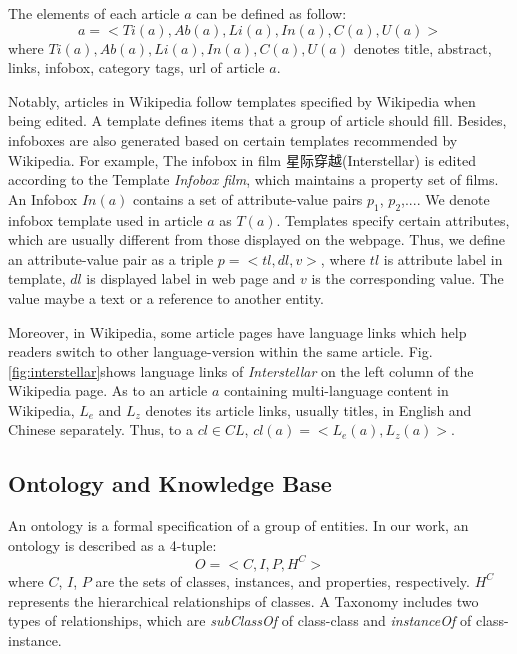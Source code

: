 \documentclass[runningheads,a4paper]{llncs}
\begin{document}
%
The elements of each article $a$ can be defined as follow:
\begin{equation}
    a = <Ti(a),Ab(a),Li(a),In(a),C(a),U(a)>
\end{equation}
where $Ti(a),Ab(a),Li(a),In(a),C(a),U(a)$ denotes title, abstract, links, infobox, category tags, url of article $a$.

Notably, articles in Wikipedia follow templates specified by Wikipedia when being edited. A template defines items that a group of article should fill. Besides, infoboxes are also generated based on certain templates recommended by Wikipedia. For example, The infobox in film 星际穿越(Interstellar) is edited according to the Template \emph{Infobox film}, which maintains a property set of films. An Infobox $In(a)$ contains a set of attribute-value pairs {$p_{1}$, $p_{2}$,...}. We denote infobox template used in article $a$ as $T(a)$. Templates specify certain attributes, which are usually different from those displayed on the webpage. Thus, we define an attribute-value pair as a triple $p=<tl,dl,v>$, where $tl$ is attribute label in template, $dl$ is displayed label in web page and $v$ is the corresponding value. The value maybe a text or a reference to another entity.

Moreover, in Wikipedia, some article pages have language links which help readers switch to other language-version within the same article. Fig. \ref{fig:interstellar}shows language links of \emph{Interstellar} on the left column of the Wikipedia page. As to an article $a$ containing multi-language content in Wikipedia, $L_{e}$ and $L_{z}$ denotes its article links, usually titles, in English and Chinese separately. Thus, to a $cl \in CL$, $cl(a) = <L_{e}(a), L_{z}(a)>$.

\subsection{Ontology and Knowledge Base}

An ontology is a formal specification of a group of entities. In our work, an ontology is described as a 4-tuple:
\begin{equation}
    O = <C,I,P,H^C>
\end{equation}
where $C$, $I$, $P$ are the sets of classes, instances, and properties, respectively. $H^C$ represents the hierarchical relationships of classes. A Taxonomy includes two types of relationships, which are \textit{subClassOf} of class-class and \textit{instanceOf} of class-instance.
\end{document}
